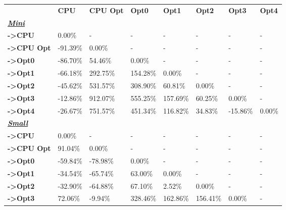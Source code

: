 \begin{table}[H]
    \centering
    \begin{tabular}{llllllll}
    \rowcolor[HTML]{DAE8FC} \ &  \textbf{CPU} &  \textbf{CPU Opt} &  \textbf{Opt0} &  \textbf{Opt1} &  \textbf{Opt2} &  \textbf{Opt3} &  \textbf{Opt4} \\
    \cellcolor[HTML]{DAE8FC} \textbf{\textbf{{\emph{{\underline{{Mini}}}}}}} &  &  &  &  &  &  &  \\
    \rowcolor[HTML]{EFEFEF} \cellcolor[HTML]{DAE8FC} \textbf{->CPU} & 0.00\% & - & - & - & - & - & - \\
    \cellcolor[HTML]{DAE8FC} \textbf{->CPU Opt} & -91.39\% & 0.00\% & - & - & - & - & - \\
    \rowcolor[HTML]{EFEFEF} \cellcolor[HTML]{DAE8FC} \textbf{->Opt0} & -86.70\% & 54.46\% & 0.00\% & - & - & - & - \\
    \cellcolor[HTML]{DAE8FC} \textbf{->Opt1} & -66.18\% & 292.75\% & 154.28\% & 0.00\% & - & - & - \\
    \rowcolor[HTML]{EFEFEF} \cellcolor[HTML]{DAE8FC} \textbf{->Opt2} & -45.62\% & 531.57\% & 308.90\% & 60.81\% & 0.00\% & - & - \\
    \cellcolor[HTML]{DAE8FC} \textbf{->Opt3} & -12.86\% & 912.07\% & 555.25\% & 157.69\% & 60.25\% & 	0.00\% & - \\
    \rowcolor[HTML]{EFEFEF} \cellcolor[HTML]{DAE8FC} \textbf{->Opt4} & -26.67\% & 751.57\% & 451.34\% & 116.82\% & 34.83\% & 	-15.86\% & 	0.00\% \\
    \cellcolor[HTML]{DAE8FC} \textbf{\textbf{{\emph{{\underline{{Small}}}}}}} &  &  &  &  &  &  &  \\
    \rowcolor[HTML]{EFEFEF} \cellcolor[HTML]{DAE8FC} \textbf{->CPU} & 0.00\% & - & - & - & - & - & - \\
    \cellcolor[HTML]{DAE8FC} \textbf{->CPU Opt} & 91.04\% & 0.00\% & - & - & - & - & - \\
    \rowcolor[HTML]{EFEFEF} \cellcolor[HTML]{DAE8FC} \textbf{->Opt0} & -59.84\% & -78.98\% & 0.00\% & - & - & - & - \\
    \cellcolor[HTML]{DAE8FC} \textbf{->Opt1} & -34.54\% & -65.74\% & 63.00\% & 0.00\% & - & - & - \\
    \rowcolor[HTML]{EFEFEF} \cellcolor[HTML]{DAE8FC} \textbf{->Opt2} & -32.90\% & -64.88\% & 67.10\% & 2.52\% & 0.00\% & - & - \\
    \cellcolor[HTML]{DAE8FC} \textbf{->Opt3} & 72.06\% & -9.94\% & 328.46\% & 162.86\% & 156.41\% & 	0.00\% & - \\

\end{tabular}
\end{table}
